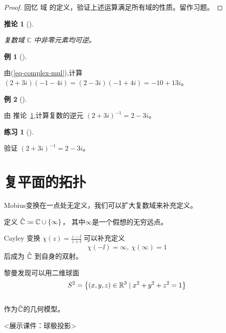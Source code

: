 \documentclass[
  chinese-hans,
  letterpaper,
  fontset=fandol]{ctexbook}
\theoremstyle{definition}
\newtheorem{example}{例}[chapter]
\theoremstyle{plain}
\theoremstyle{definition}
\theoremstyle{plain}
\newtheorem{corollary}{推论}[chapter]
\theoremstyle{definition}
\newtheorem{exercise}{练习}[chapter]
\theoremstyle{remark}
\begin{document}
\begin{proof}
回忆 域 的定义，验证上述运算满足所有域的性质。留作习题。
\end{proof}

\begin{corollary}[]\protect\hypertarget{cor-complex-field}{}\label{cor-complex-field}

复数域 \(\mathbb{C}\) 中非零元素均可逆。

\end{corollary}

\begin{example}[]\protect\hypertarget{exm-complex-field}{}\label{exm-complex-field}

由(\ref{eq-complex-mul}),计算 \((2+3i)(-1-4i)=(2-3i)(-1+4i)=-10+13i\)。

\end{example}

\begin{example}[]\protect\hypertarget{exm-complex-field-2}{}\label{exm-complex-field-2}

由 推论~\ref{cor-complex-field},计算复数的逆元 \((2+3i)^{-1}=2-3i\)。

\end{example}

\begin{exercise}[]\protect\hypertarget{exr-complex-field-2}{}\label{exr-complex-field-2}

验证 \((2+3i)^{-1}=2-3i\)。

\end{exercise}

\section{复平面的拓扑}\label{ux590dux5e73ux9762ux7684ux62d3ux6251}

Mobius变换在一点处无定义，我们可以扩大复数域来补充定义。

定义 \(\hat{\mathbb{C}}\coloneqq\mathbb{C}\cup\left\{ \infty\right\}\)，
其中\(\infty\)是一个假想的无穷远点。

Cayley 变换 \(\chi(z)=\frac{z-\ii}{z+\ii}\) 可以补充定义 \[
\chi(-\ii)=\infty,\ \chi(\infty)=1
\] 后成为 \(\hat{\mathbb{C}}\) 到自身的双射。

黎曼发现可以用二维球面 \[
S^{2}=\left\{ \left(x,y,z\right)\in\mathbb{R}^{3}\mid x^{2}+y^{2}+z^{2}=1\right\} 
\]\\
作为\(\hat{\mathbb{C}}\)的几何模型。

\textless 展示课件：球极投影\textgreater{}
\end{document}
